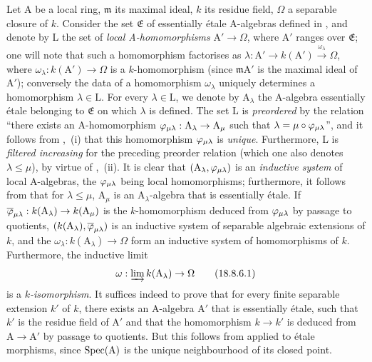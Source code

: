 \begin{env}[18.8.6]
\label{IV.18.8.6}
Let A be a local ring, $\mathfrak{m}$ its maximal ideal, $k$ its residue field, $\Omega$ a separable closure of $k$.
Consider the set $\mathfrak{E}$ of essentially \'{e}tale A-algebras defined in , and denote by L the set of \emph{local A-homomorphisms} $\mathrm{A}'\to\Omega$, where $\mathrm{A}'$ ranges over $\mathfrak{E}$;
one will note that such a homomorphism factorises as $\lambda:\mathrm{A}'\to k(\mathrm{A}')\xrightarrow{\omega_\lambda}\Omega$, where $\omega_\lambda:k(\mathrm{A}')\to\Omega$ is a $k$-homomorphism (since $\mathfrak{m}\mathrm{A}'$ is the maximal ideal of $\mathrm{A}'$);
conversely the data of a homomorphism $\omega_\lambda$ uniquely determines a homomorphism $\lambda\in\mathrm{L}$.
For every $\lambda\in\mathrm{L}$, we denote by $\mathrm{A}_\lambda$ the A-algebra essentially \'{e}tale belonging to $\mathfrak{E}$ on which $\lambda$ is defined.
The set L is \emph{preordered} by the relation ``there exists an A-homomorphism $\varphi_{\mu\lambda}:\mathrm{A}_\lambda\to\mathrm{A}_\mu$ such that $\lambda=\mu\circ\varphi_{\mu\lambda}$'', and it follows from ,~(i) that this homomorphism $\varphi_{\mu\lambda}$ is \emph{unique}.
Furthermore, L is \emph{filtered increasing} for the preceding preorder relation (which one also denotes $\lambda\leq\mu$), by virtue
of ,~(ii).
It is clear that $(\mathrm{A}_\lambda,\varphi_{\mu\lambda})$ is an \emph{inductive system} of local A-algebras, the $\varphi_{\mu\lambda}$ being local homomorphisms;
furthermore, it follows from  that for $\lambda\leq\mu$, $\mathrm{A}_\mu$ is an $\mathrm{A}_\lambda$-algebra that is essentially \'{e}tale.
If $\overline{\varphi}_{\mu\lambda}:k(\mathrm{A}_\lambda)\to k(\mathrm{A}_\mu)$ is the $k$-homomorphism deduced from $\varphi_{\mu\lambda}$ by passage to quotients, $(k(\mathrm{A}_\lambda),\overline{\varphi}_{\mu\lambda})$ is an inductive system of separable algebraic extensions of $k$, and the $\omega_\lambda:k(\mathrm{A}_\lambda)\to\Omega$ form an inductive system of homomorphisms of $k$.
Furthermore, the inductive limit
\begin{equation}
  \omega:\varinjlim k(\mathrm{A}_\lambda)\to\Omega
  \label{IV.18.8.6.1}
\tag{18.8.6.1}
\end{equation}
is a $k$\emph{-isomorphism}.
It suffices indeed to prove that for every finite separable extension $k'$ of $k$, there exists an A-algebra $\mathrm{A}'$ that is essentially \'{e}tale, such that $k'$ is the residue field of $\mathrm{A}'$ and that the homomorphism $k\to k'$ is deduced from $\mathrm{A}\to\mathrm{A}'$ by passage to quotients.
But this follows from  applied to \'{e}tale morphisms, since $\operatorname{Spec}(\mathrm{A})$ is the unique neighbourhood of its closed point.


\end{env}
